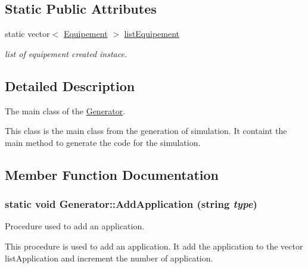 \subsection*{Static Public Attributes}
\begin{CompactItemize}
\item 
static vector$<$ \hyperlink{class_equipement}{Equipement} $>$ \hyperlink{class_generator_0dd96c3c4305399cefa743714a889972}{listEquipement}
\begin{CompactList}\small\item\em list of equipement created instace. \item\end{CompactList}\end{CompactItemize}


\subsection{Detailed Description}
The main class of the \hyperlink{class_generator}{Generator}. 

This class is the main class from the generation of simulation. It containt the main method to generate the code for the simulation. 

\subsection{Member Function Documentation}
\hypertarget{class_generator_a8025acf09f21f25e6d49c55b0321569}{
\subsubsection[{AddApplication}]{\setlength{\rightskip}{0pt plus 5cm}static void Generator::AddApplication (string {\em type})}}
\label{class_generator_a8025acf09f21f25e6d49c55b0321569}


Procedure used to add an application. 

This procedure is used to add an application. It add the application to the vector listApplication and increment the number of application.

